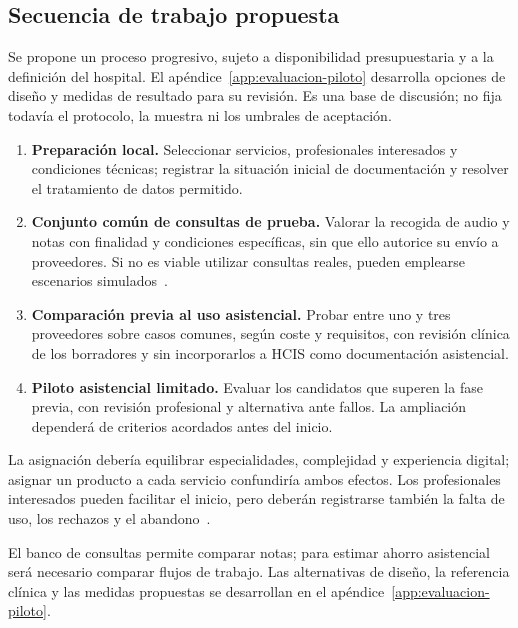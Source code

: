 \subsection{Secuencia de trabajo propuesta}
Se propone un proceso progresivo, sujeto a disponibilidad presupuestaria y a la definición del hospital. El apéndice~\ref{app:evaluacion-piloto} desarrolla opciones de diseño y medidas de resultado para su revisión. Es una base de discusión; no fija todavía el protocolo, la muestra ni los umbrales de aceptación.
\begin{enumerate}
\item \textbf{Preparación local.} Seleccionar servicios, profesionales interesados y condiciones técnicas; registrar la situación inicial de documentación y resolver el tratamiento de datos permitido.
\item \textbf{Conjunto común de consultas de prueba.} Valorar la recogida de audio y notas con finalidad y condiciones específicas, sin que ello autorice su envío a proveedores. Si no es viable utilizar consultas reales, pueden emplearse escenarios simulados~\cite{rgpd2016,NNWFT2JX}.
\item \textbf{Comparación previa al uso asistencial.} Probar entre uno y tres proveedores sobre casos comunes, según coste y requisitos, con revisión clínica de los borradores y sin incorporarlos a HCIS como documentación asistencial.
\item \textbf{Piloto asistencial limitado.} Evaluar los candidatos que superen la fase previa, con revisión profesional y alternativa ante fallos. La ampliación dependerá de criterios acordados antes del inicio.
\end{enumerate}

La asignación debería equilibrar especialidades, complejidad y experiencia digital; asignar un producto a cada servicio confundiría ambos efectos. Los profesionales interesados pueden facilitar el inicio, pero deberán registrarse también la falta de uso, los rechazos y el abandono~\cite{PR93N8FN,FKHM4UFL}.

El banco de consultas permite comparar notas; para estimar ahorro asistencial será necesario comparar flujos de trabajo. Las alternativas de diseño, la referencia clínica y las medidas propuestas se desarrollan en el apéndice~\ref{app:evaluacion-piloto}.
